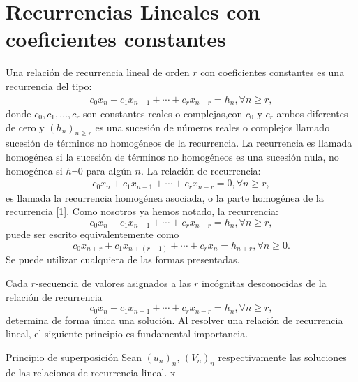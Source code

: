 \section{Recurrencias Lineales con coeficientes constantes}

Una relación de recurrencia lineal de orden $r$ con coeficientes constantes es una recurrencia del tipo:
\begin{align}\label{1}
	c_{0}x_{n}+c_{1}x_{n-1}+\cdots+c_{r}x_{n-r}=h_{n},\forall n\geq r,
\end{align}
donde $c_{0},c_{1},\ldots,c_{r}$ son constantes reales o complejas,con $c_{0}$ y $c_{r}$ ambos diferentes de cero y $(h_{n})_{n\geq r}$ es una sucesión de números reales o complejos llamado sucesión de términos no homogéneos de la recurrencia. La recurrencia es llamada homogénea si la sucesión de términos no homogéneos es una sucesión nula, no homogénea si $h\neg 0 $ para algún $n$. La relación de recurrencia:
\begin{align}\label{2}
	c_{0}x_{n}+c_{1}x_{n-1}+\cdots+c_{r}x_{n-r}=0,\forall n\geq r,
\end{align}
es llamada la recurrencia homogénea asociada, o la parte homogénea de la recurrencia \eqref{1}. Como nosotros ya hemos notado, la recurrencia:
\begin{equation*}
	c_{0}x_{n}+c_{1}x_{n-1}+\cdots+c_{r}x_{n-r}=h_{n},\forall n\geq r,
\end{equation*}
puede ser escrito equivalentemente como
\begin{equation*}
	c_{0}x_{n+r}+c_{1}x_{n+(r-1)}+\cdots+c_{r}x_{n}=h_{n+r},\forall n\geq 0.
\end{equation*}
Se puede utilizar cualquiera de las formas presentadas.

\begin{remark}
	Cada $r$-secuencia de valores asignados a las $r$ incógnitas desconocidas de la relación de recurrencia
	\begin{equation*}
		c_{0}x_{n}+c_{1}x_{n-1}+\cdots+c_{r}x_{n-r}=h_{n},\forall n\geq r,
	\end{equation*}
	determina de forma única una solución. Al resolver una relación de recurrencia lineal, el siguiente principio es fundamental importancia.
\end{remark}

\begin{proposition}{Principio de superposición}
	Sean $(u_{n})_n$, $(V_{n})_{n}$ respectivamente las soluciones de las relaciones de recurrencia lineal. x
\end{proposition}

